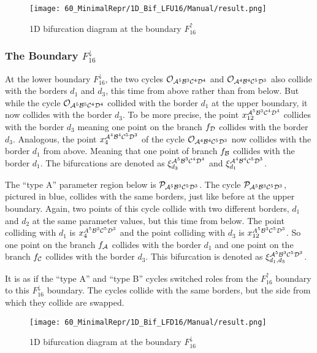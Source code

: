 \begin{figure}
    \centering
    \texttt{[image: 60\_MinimalRepr/1D\_Bif\_LFU16/Manual/result.png]}
    \label{fig:final.bifurcation.F.up}
    \caption{1D bifurcation diagram at the boundary $F_{16}^\uparrow$}
\end{figure}

\subsubsection{The Boundary $F_{16}^\downarrow$}
\label{sec:minrep.bif.D}

At the lower boundary $F_{16}^\downarrow$, the two cycles $\mathcal{O}_{\mathcal{A}^5\mathcal{B}^3\mathcal{C}^4\mathcal{D}^4}$ and $\mathcal{O}_{\mathcal{A}^4\mathcal{B}^4\mathcal{C}^5\mathcal{D}^3}$ also collide with the borders $d_1$ and $d_3$, this time from above rather than from below.
But while the cycle $\mathcal{O}_{\mathcal{A}^5\mathcal{B}^5\mathcal{C}^4\mathcal{D}^4}$ collided with the border $d_1$ at the upper boundary, it now collides with the border $d_3$.
To be more precise, the point $x_{12}^{\mathcal{A}^5\mathcal{B}^3\mathcal{C}^4\mathcal{D}^4}$ collides with the border $d_3$ meaning one point on the branch $f_{\mathcal{D}}$ collides with the border $d_3$.
Analogous, the point $x_{4}^{\mathcal{A}^4\mathcal{B}^4\mathcal{C}^5\mathcal{D}^3}$ of the cycle $\mathcal{O}_{\mathcal{A}^4\mathcal{B}^4\mathcal{C}^5\mathcal{D}^3}$ now collides with the border $d_1$ from above.
Meaning that one point of branch $f_{\mathcal{B}}$ collides with the border $d_1$. The bifurcations are denoted as $\xi_{d_3}^{\mathcal{A}^5\mathcal{B}^3\mathcal{C}^4\mathcal{D}^4}$ and $\xi_{d_1}^{\mathcal{A}^4\mathcal{B}^4\mathcal{C}^5\mathcal{D}^3}$.

The ``type A'' parameter region below is $\mathcal{P}_{\mathcal{A}^5\mathcal{B}^3\mathcal{C}^5\mathcal{D}^3}$.
The cycle $\mathcal{P}_{\mathcal{A}^5\mathcal{B}^3\mathcal{C}^5\mathcal{D}^3}$, pictured in blue, collides with the same borders, just like before at the upper boundary.
Again, two points of this cycle collide with two different borders, $d_1$ and $d_2$ at the same parameter values, but this time from below.
The point colliding with $d_1$ is $x_{4}^{A^5\mathcal{B}^3\mathcal{C}^5\mathcal{D}^3}$ and  the point colliding with $d_3$ is $x_{12}^{A^5\mathcal{B}^3\mathcal{C}^5\mathcal{D}^3}$.
So one point on the branch $f_{\mathcal{A}}$ collides with the border $d_1$ and one point on the branch $f_{\mathcal{C}}$ collides with the border $d_3$.
This bifurcation is denoted as $\xi_{d_1, d_3}^{\mathcal{A}^5\mathcal{B}^3\mathcal{C}^5\mathcal{D}^3}$.

It is as if the ``type A'' and ``type B'' cycles switched roles from the $F_{16}^\uparrow$ boundary to this $F_{16}^\downarrow$ boundary.
The cycles collide with the same borders, but the side from which they collide are swapped.

\begin{figure}
    \centering
    \texttt{[image: 60\_MinimalRepr/1D\_Bif\_LFD16/Manual/result.png]}
    \label{fig:final.bifurcation.F.down}
    \caption{1D bifurcation diagram at the boundary $F_{16}^\downarrow$}
\end{figure}

